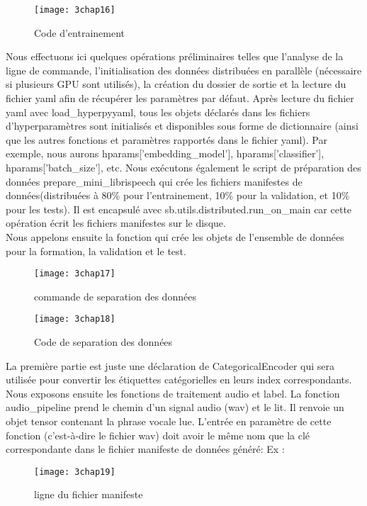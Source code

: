 \begin{figure}[h]
	\centering
	\texttt{[image: 3chap16]}
	\caption{Code d'entrainement}
	\label{fig:3chap16}
\end{figure}


Nous effectuons ici quelques opérations préliminaires telles que l'analyse de la ligne de commande, l'initialisation des données distribuées en parallèle (nécessaire si plusieurs GPU sont utilisés), la création du dossier de sortie et la lecture du fichier yaml afin de récupérer les paramètres par défaut.
Après lecture du fichier yaml avec load\_hyperpyyaml, tous les objets déclarés dans les fichiers d'hyperparamètres sont initialisés et disponibles sous forme de dictionnaire (ainsi que les autres fonctions et paramètres rapportés dans le fichier yaml). Par exemple, nous aurons hparams['embedding\_model'], hparams['classifier'], hparams['batch\_size'], etc.
Nous exécutons également le script de préparation des données prepare\_mini\_librispeech qui crée les fichiers manifestes de données(distribuées à 80\% pour l'entrainement, 10\% pour la validation, et 10\% pour les tests). Il est encapsulé avec sb.utils.distributed.run\_on\_main car cette opération écrit les fichiers manifestes sur le disque.
\\Nous appelons ensuite la fonction qui crée les objets de l'ensemble de données pour la formation, la validation et le test.

\begin{figure}[h]
	\centering
	\texttt{[image: 3chap17]}
	\caption{commande de separation des données}
	\label{fig:3chap17}
\end{figure}

\begin{figure}[h]
	\centering
	\texttt{[image: 3chap18]}
	\caption{Code de separation des données}
	\label{fig:3chap18}
\end{figure}

La première partie est juste une déclaration de CategoricalEncoder qui sera utilisée pour convertir les étiquettes catégorielles en leurs index correspondants.
Nous exposons ensuite  les fonctions de traitement audio et label.
La fonction  audio\_pipeline prend le chemin d’un signal audio (wav) et le lit. Il renvoie un objet tensor contenant la phrase vocale lue. L'entrée en paramètre de cette fonction (c'est-à-dire le fichier wav) doit avoir le même nom que la clé correspondante dans le fichier manifeste de données généré:
Ex : 
\begin{figure}[h]
	\centering
	\texttt{[image: 3chap19]}
	\caption{ligne du fichier manifeste}
	\label{fig:3chap19}
\end{figure}

